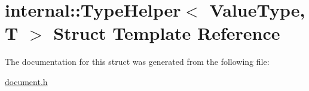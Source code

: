\hypertarget{a02024}{}\section{internal\+:\+:Type\+Helper$<$ Value\+Type, T $>$ Struct Template Reference}
\label{a02024}


The documentation for this struct was generated from the following file\+:\begin{DoxyCompactItemize}
\item 
\hyperlink{a00476}{document.\+h}\end{DoxyCompactItemize}
